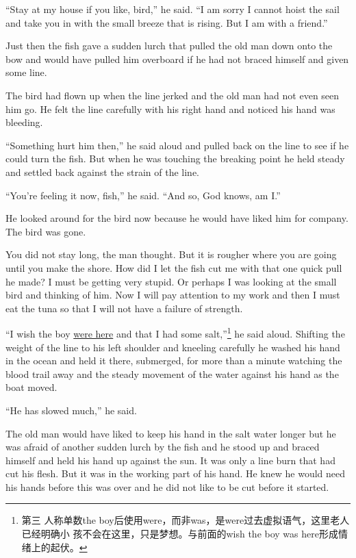 \documentclass[fontset=ubuntu,zihao=-4]{ctexrep}
\begin{document}
``Stay at my house if you like, bird,'' he said. ``I am sorry I cannot
\gls{hoist} the sail and take you in with the small breeze that is rising.
But I am with a friend.''

Just then the fish gave a sudden lurch that pulled the old man down onto the
bow and would have pulled him \gls{overboard} if he had not braced himself and
given some line.

The bird had flown up when the line jerked and the old man had not even seen
him go. He felt the line carefully with his right hand and \gls{noticed} his
hand was bleeding.

``Something hurt him then,'' he said aloud and pulled back on the line to
see if he could turn the fish. But when he was touching the breaking point
he held steady and settled back against the strain of the line.

``You're feeling it now, fish,'' he said. ``And so, God knows, am I.''

He looked around for the bird now because he would have liked him for
\gls{company}. The bird was gone.

You did not stay long, the man thought. But it is rougher where you are
going until you make the shore. How did I let the fish cut me with that one
quick pull he made? I must be getting very stupid. Or perhaps I was looking
at the small bird and thinking of him. Now I will pay \gls{attention} to my work
and then I must eat the tuna so that I will not have a \gls{failure} of strength.

``I wish the boy \uline{were here} and that I had some salt,''\footnote{第三
  人称单数the boy后使用were，而非was，是were过去虚拟语气，这里老人已经明确小
  孩不会在这里，只是梦想。与前面的wish the boy was here形成情绪上的起伏。}
he said aloud. Shifting the weight of the line to his left shoulder and
\gls{kneel}ing carefully he washed his hand in the ocean and held it there,
\gls{submerged}, for more than a minute watching the blood trail away and
the steady movement of the water against his hand as the boat moved.

``He has slowed much,'' he said.

The old man would have liked to keep his hand in the salt water longer but
he was afraid of another sudden lurch by the fish and he stood up and braced
himself and held his hand up against the sun. It was only a line burn that
had cut his flesh. But it was in the working part of his hand. He knew he
would need his hands before this was over and he did not like to be cut
before it started.
\end{document}
